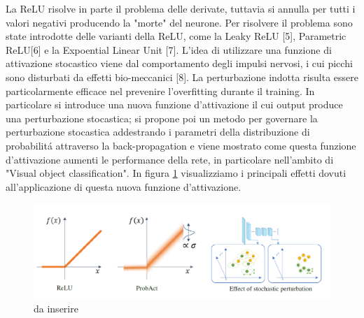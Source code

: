 \documentclass[a4paper,10pt]{article}
\begin{document}
 La ReLU risolve in parte il problema delle derivate, tuttavia si annulla per tutti i valori negativi producendo la "morte" del neurone. Per risolvere il problema sono state introdotte delle varianti della ReLU, come la Leaky ReLU [5], Parametric ReLU[6] e la Expoential Linear Unit [7]. 
 L'idea di utilizzare una funzione di attivazione stocastico viene dal comportamento degli impulsi nervosi, i cui picchi sono disturbati da effetti bio-meccanici [8]. La perturbazione indotta risulta essere particolarmente efficace nel prevenire l'overfitting durante il training. In particolare si introduce una nuova funzione d'attivazione il cui output produce una perturbazione stocastica; si propone poi un metodo per governare la perturbazione stocastica addestrando i parametri della distribuzione di probabilit\'a  attraverso la back-propagation e viene mostrato come questa funzione d'attivazione aumenti le performance della rete, in particolare nell'ambito di "Visual object classification". 
 In figura \ref{ProbActEffectpng} visualizziamo i principali effetti dovuti all'applicazione di questa nuova funzione d'attivazione. 
 \begin{figure}[h!]
  \centering
  \includegraphics[width=\linewidth]{ProbActEffect.png} 
  \caption{da inserire}
  \label{ProbActEffectpng}
 \end{figure}
\end{document}
